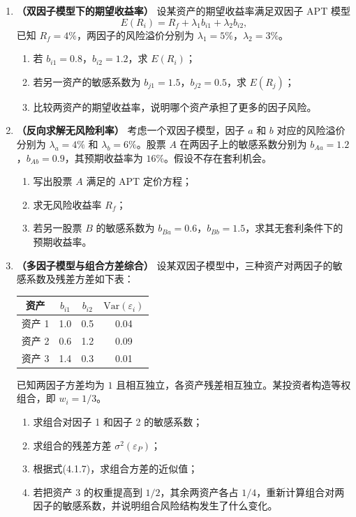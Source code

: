 \documentclass{article}
\begin{document}
\begin{enumerate}[label=\textbf{\arabic*.}]
\item \textbf{（双因子模型下的期望收益率）}
设某资产的期望收益率满足双因子 APT 模型
\[
E(R_i)=R_f+\lambda_1 b_{i1}+\lambda_2 b_{i2},
\]
已知 $R_f=4\%$，两因子的风险溢价分别为 $\lambda_1=5\%$，$\lambda_2=3\%$。
\begin{enumerate}[label=(\arabic*)]
    \item 若 $b_{i1}=0.8$，$b_{i2}=1.2$，求 $E(R_i)$；
    \item 若另一资产的敏感系数为 $b_{j1}=1.5$，$b_{j2}=0.5$，求 $E(R_j)$；
    \item 比较两资产的期望收益率，说明哪个资产承担了更多的因子风险。
\end{enumerate}

\item \textbf{（反向求解无风险利率）}
考虑一个双因子模型，因子 $a$ 和 $b$ 对应的风险溢价分别为 $\lambda_a=4\%$ 和 $\lambda_b=6\%$。股票 $A$ 在两因子上的敏感系数分别为 $b_{A a}=1.2$，$b_{A b}=0.9$，其预期收益率为 $16\%$。假设不存在套利机会。
\begin{enumerate}[label=(\arabic*)]
    \item 写出股票 $A$ 满足的 APT 定价方程；
    \item 求无风险收益率 $R_f$；
    \item 若另一股票 $B$ 的敏感系数为 $b_{B a}=0.6$，$b_{B b}=1.5$，求其无套利条件下的预期收益率。
\end{enumerate}


\item \textbf{（多因子模型与组合方差综合）}
设某双因子模型中，三种资产对两因子的敏感系数及残差方差如下表：

\begin{table}[h]
    \centering
    \begin{tabular}{cccc}
        \toprule
        资产 & $b_{i1}$ & $b_{i2}$ & $\mathrm{Var}(\varepsilon_i)$ \\
        \midrule
        资产 1 & 1.0 & 0.5 & 0.04 \\
        资产 2 & 0.6 & 1.2 & 0.09 \\
        资产 3 & 1.4 & 0.3 & 0.01 \\
        \bottomrule
    \end{tabular}
\end{table}

已知两因子方差均为 $1$ 且相互独立，各资产残差相互独立。某投资者构造等权组合，即 $w_i=1/3$。
\begin{enumerate}[label=(\arabic*)]
    \item 求组合对因子 1 和因子 2 的敏感系数；
    \item 求组合的残差方差 $\sigma^2(\varepsilon_P)$；
    \item 根据式(4.1.7)，求组合方差的近似值；
    \item 若把资产 3 的权重提高到 $1/2$，其余两资产各占 $1/4$，重新计算组合对两因子的敏感系数，并说明组合风险结构发生了什么变化。
\end{enumerate}


\end{enumerate}
\end{document}
